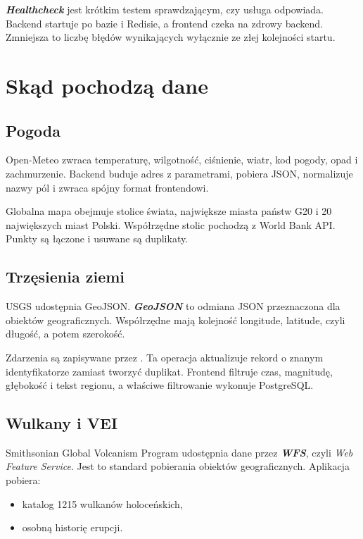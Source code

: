 \documentclass[14pt,a5paper,oneside]{extarticle}
\newcommand{\term}[1]{\textbf{\textit{#1}}}
\newcommand{\code}[1]{\texttt{\detokenize{#1}}}
\begin{document}
\term{Healthcheck} jest krótkim testem sprawdzającym, czy usługa odpowiada.
Backend startuje po bazie i Redisie, a frontend czeka na zdrowy backend.
Zmniejsza to liczbę błędów wynikających wyłącznie ze złej kolejności startu.

\section{Skąd pochodzą dane}

\subsection{Pogoda}

Open-Meteo zwraca temperaturę, wilgotność, ciśnienie, wiatr, kod pogody,
opad i zachmurzenie. Backend buduje adres z parametrami, pobiera JSON,
normalizuje nazwy pól i zwraca spójny format frontendowi.

Globalna mapa obejmuje stolice świata, największe miasta państw G20 i
20 największych miast Polski. Współrzędne stolic pochodzą z World Bank API.
Punkty są łączone i usuwane są duplikaty.

\subsection{Trzęsienia ziemi}

USGS udostępnia GeoJSON. \term{GeoJSON} to odmiana JSON przeznaczona dla
obiektów geograficznych. Współrzędne mają kolejność longitude, latitude,
czyli długość, a potem szerokość.

Zdarzenia są zapisywane przez \code{update_or_create}. Ta operacja aktualizuje
rekord o znanym identyfikatorze zamiast tworzyć duplikat. Frontend filtruje
czas, magnitudę, głębokość i tekst regionu, a właściwe filtrowanie wykonuje
PostgreSQL.

\subsection{Wulkany i VEI}

Smithsonian Global Volcanism Program udostępnia dane przez
\term{WFS}, czyli \textit{Web Feature Service}. Jest to standard pobierania
obiektów geograficznych. Aplikacja pobiera:

\begin{itemize}
  \item katalog 1215 wulkanów holoceńskich,
  \item osobną historię erupcji.
\end{itemize}
\end{document}
